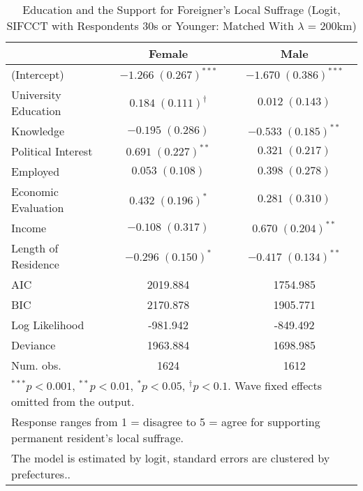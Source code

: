 
\begin{table}
\caption{Education and the Support for Foreigner's Local Suffrage (Logit, SIFCCT with Respondents 30s or Younger: Matched With $\lambda$ = 200km)}
\begin{center}
\begin{tabular}{l c c }
\toprule
 & Female & Male \\
\midrule
(Intercept)          & $-1.266 \; (0.267)^{***}$    & $-1.670 \; (0.386)^{***}$ \\
University Education & $0.184 \; (0.111)^{\dagger}$ & $0.012 \; (0.143)$        \\
Knowledge            & $-0.195 \; (0.286)$          & $-0.533 \; (0.185)^{**}$  \\
Political Interest   & $0.691 \; (0.227)^{**}$      & $0.321 \; (0.217)$        \\
Employed             & $0.053 \; (0.108)$           & $0.398 \; (0.278)$        \\
Economic Evaluation  & $0.432 \; (0.196)^{*}$       & $0.281 \; (0.310)$        \\
Income               & $-0.108 \; (0.317)$          & $0.670 \; (0.204)^{**}$   \\
Length of Residence  & $-0.296 \; (0.150)^{*}$      & $-0.417 \; (0.134)^{**}$  \\
\midrule
AIC                  & 2019.884                     & 1754.985                  \\
BIC                  & 2170.878                     & 1905.771                  \\
Log Likelihood       & -981.942                     & -849.492                  \\
Deviance             & 1963.884                     & 1698.985                  \\
Num. obs.            & 1624                         & 1612                      \\
\bottomrule
\multicolumn{3}{l}{\scriptsize{$^{***}p<0.001$, $^{**}p<0.01$, $^*p<0.05$, $^{\dagger}p<0.1$. Wave fixed effects omitted from the output.}} \\ \multicolumn{3}{l}{\scriptsize{Response ranges from 1 = disagree to 5 = agree for supporting permanent resident's local suffrage.}} \\ \multicolumn{3}{l}{\scriptsize{The model is estimated by logit, standard errors are clustered by prefectures..}}
\end{tabular}
\label{lgtab_smo_m4}
\end{center}
\end{table}

